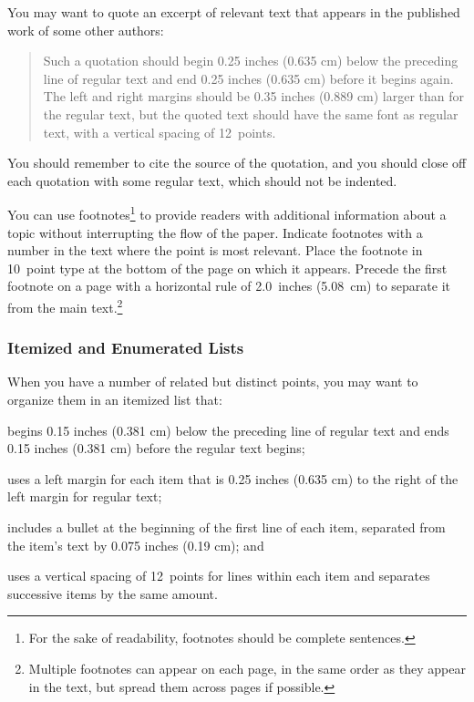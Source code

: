 \documentclass[11pt,letterpaper]{article}
\begin{document}
You may want to quote an excerpt of relevant text that appears in 
the published work of some other authors: 

\begin{quote}
Such a quotation should begin 0.25 inches (0.635 cm) below the preceding 
line of regular text and end 0.25 inches (0.635 cm) before it begins
again. The left and right margins should be 0.35 inches (0.889 cm) larger 
than for the regular text, but the quoted text should have the same
font as regular text, with a vertical spacing of 12~points.
\end{quote}

\noindent
You should remember to cite the source of the quotation, and you should 
close off each quotation with some regular text, which should not be
indented.

You can use footnotes\footnote{For the sake of readability, footnotes
should be complete sentences.} to provide readers with additional
information about a topic without interrupting the flow of the paper.
Indicate footnotes with a number in the text where the point is most
relevant. Place the footnote in 10~point type at the bottom of the
page on which it appears. Precede the first footnote on a page 
with a horizontal rule of 2.0~inches (5.08~cm) to separate it from 
the main text.\footnote{Multiple footnotes can appear on each page, 
in the same order as they appear in the text, but spread them across
pages if possible.}

\subsubsection{Itemized and Enumerated Lists}

When you have a number of related but distinct points, you may want
to organize them in an itemized list that: 

\vskip 0.05in

\cbullet 
begins 0.15 inches (0.381 cm) below the preceding line of regular text 
and ends 0.15 inches (0.381 cm) before the regular text begins; 

\cbullet 
uses a left margin for each item that is 0.25 inches (0.635 cm) to the 
right of the left margin for regular text; 

\cbullet 
includes a bullet at the beginning of the first line of each item,
separated from the item's text by 0.075 inches (0.19 cm); and

\cbullet 
uses a vertical spacing of 12~points for lines within each item 
and separates successive items by the same amount. 
\end{document}
